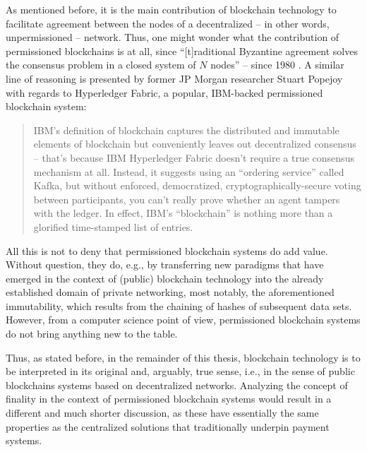 As mentioned before, it is the main contribution of blockchain technology to facilitate agreement between the nodes of a decentralized -- in other words, unpermissioned -- network.
Thus, one might wonder what the contribution of permissioned blockchains is at all, since ``[t]raditional Byzantine agreement solves the consensus problem in a closed system of $N$ nodes'' \autocite[1]{mazieres2019simplescp} -- since 1980 \autocite{lamport1980}.
A similar line of reasoning is presented by former JP Morgan researcher Stuart Popejoy with regards to Hyperledger Fabric, a popular, IBM-backed permissioned blockchain system: \autocite{thenextweb2019hyperledgerrealblockchain}

\begin{quote}
  IBM's definition of blockchain captures the distributed and immutable elements of blockchain but conveniently leaves out decentralized consensus -- that's because IBM Hyperledger Fabric doesn't require a true consensus mechanism at all.
  Instead, it suggests using an ``ordering service'' called Kafka, but without enforced, democratized, cryptographically-secure voting between participants, you can’t really prove whether an agent tampers with the ledger. In effect, IBM’s ``blockchain'' is nothing more than a glorified time-stamped list of entries.
\end{quote}

All this is not to deny that permissioned blockchain systems do add value.
Without question, they do, e.g., by transferring new paradigms that have emerged in the context of (public) blockchain technology into the already established domain of private networking, most notably, the aforementioned immutability, which results from the chaining of hashes of subsequent data sets.
However, from a computer science point of view, permissioned blockchain systems do not bring anything new to the table.

Thus, as stated before, in the remainder of this thesis, blockchain technology is to be interpreted in its original and, arguably, true sense, i.e., in the sense of public blockchains systems based on decentralized networks.
Analyzing the concept of finality in the context of permissioned blockchain systems would result in a different and much shorter discussion, as these have essentially the same properties as the centralized solutions that traditionally underpin payment systems.
